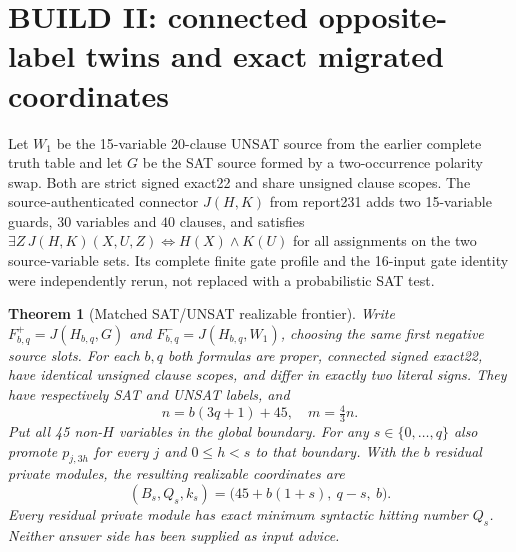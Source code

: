 \documentclass[10pt]{article}
\newtheorem{theorem}{Theorem}
\begin{document}
\section{BUILD II: connected opposite-label twins and exact migrated coordinates}
\noindent Let $W_1$ be the 15-variable 20-clause UNSAT source from the earlier complete truth table and let $G$ be the SAT source formed by a two-occurrence polarity swap. Both are strict signed exact22 and share unsigned clause scopes. The source-authenticated connector $J(H,K)$ from report231 adds two 15-variable guards, $30$ variables and $40$ clauses, and satisfies \(\exists Z\,J(H,K)(X,U,Z)\iff H(X)\land K(U)\) for all assignments on the two source-variable sets. Its complete finite gate profile and the 16-input gate identity were independently rerun, not replaced with a probabilistic SAT test.
\begin{theorem}[Matched SAT/UNSAT realizable frontier]\label{thm:pair}
Write $F^+_{b,q}=J(H_{b,q},G)$ and $F^-_{b,q}=J(H_{b,q},W_1)$, choosing the same first negative source slots. For each $b,q$ both formulas are proper, connected signed exact22, have \emph{identical unsigned clause scopes}, and differ in exactly two literal signs. They have respectively SAT and UNSAT labels, and
\[n=b(3q+1)+45,\quad m=\tfrac43n.\]
Put all 45 non-$H$ variables in the global boundary. For any $s\in\{0,\ldots,q\}$ also promote $p_{j,3h}$ for every $j$ and $0\le h<s$ to that boundary. With the $b$ residual private modules, the resulting \emph{realizable} coordinates are
\begin{equation}\label{eq:realized}
 (B_s,Q_s,k_s)=\bigl(45+b(1+s),\ q-s,\ b\bigr).
\end{equation}
Every residual private module has \emph{exact} minimum syntactic hitting number $Q_s$. Neither answer side has been supplied as input advice.
\end{theorem}
\end{document}
